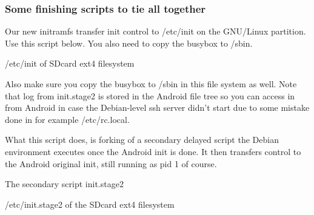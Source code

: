 \subsubsection{Some finishing scripts to tie all together}

Our new initramfs transfer init control to /etc/init on the GNU/Linux partition.
Use this script below. You also need to copy the busybox to /sbin.

/etc/init of SDcard ext4 filesystem

% 
% 
% 

Also make sure you copy the busybox to /sbin in this file system as well. Note
that log from init.stage2 is stored in the Android file tree so you can access
in from Android in case the Debian-level ssh server didn't start due to some
mistake done in for example /etc/rc.local.

What this script does, is forking of a secondary delayed script the Debian
environment executes once the Android init is done. It then transfers control to
the Android original init, still running as pid 1 of course.

The secondary script init.stage2

/etc/init.stage2 of the SDcard ext4 filesystem

% 
% 
% 
% 
% 
% 
% 
% 
% 
% 
% 

